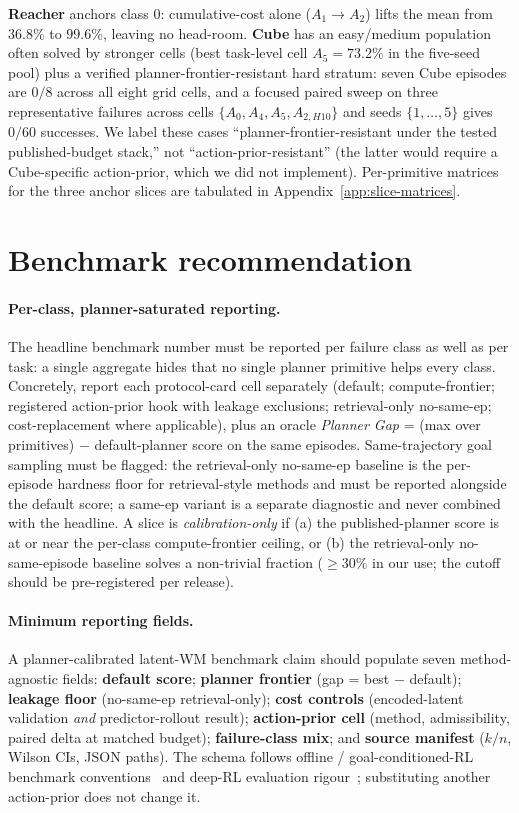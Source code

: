 \documentclass{article}
\begin{document}
\textbf{Reacher} anchors class 0: cumulative-cost alone ($A_1 \to A_2$) lifts the mean from $36.8\%$ to $99.6\%$, leaving no head-room. \textbf{Cube} has an easy/medium population often solved by stronger cells (best task-level cell $A_5 = 73.2\%$ in the five-seed pool) plus a verified planner-frontier-resistant hard stratum: seven Cube episodes are $0/8$ across all eight grid cells, and a focused paired sweep on three representative failures across cells $\{A_0, A_4, A_5, A_{2,H10}\}$ and seeds $\{1,\dots,5\}$ gives $0/60$ successes. We label these cases ``planner-frontier-resistant under the tested published-budget stack,'' not ``action-prior-resistant'' (the latter would require a Cube-specific action-prior, which we did not implement). Per-primitive matrices for the three anchor slices are tabulated in Appendix~\ref{app:slice-matrices}.

\section{Benchmark recommendation}
\label{sec:recommendation}

\paragraph{Per-class, planner-saturated reporting.}
The headline benchmark number must be reported per failure class as well as per task: a single aggregate hides that no single planner primitive helps every class. Concretely, report each protocol-card cell separately (default; compute-frontier; registered action-prior hook with leakage exclusions; retrieval-only no-same-ep; cost-replacement where applicable), plus an oracle \emph{Planner Gap} = (max over primitives) $-$ default-planner score on the same episodes. Same-trajectory goal sampling must be flagged: the retrieval-only no-same-ep baseline is the per-episode hardness floor for retrieval-style methods and must be reported alongside the default score; a same-ep variant is a separate diagnostic and never combined with the headline. A slice is \emph{calibration-only} if (a) the published-planner score is at or near the per-class compute-frontier ceiling, or (b) the retrieval-only no-same-episode baseline solves a non-trivial fraction ($\geq 30\%$ in our use; the cutoff should be pre-registered per release).

\paragraph{Minimum reporting fields.}
A planner-calibrated latent-WM benchmark claim should populate seven method-agnostic fields: \textbf{default score}; \textbf{planner frontier} (gap = best $-$ default); \textbf{leakage floor} (no-same-ep retrieval-only); \textbf{cost controls} (encoded-latent validation \emph{and} predictor-rollout result); \textbf{action-prior cell} (method, admissibility, paired delta at matched budget); \textbf{failure-class mix}; and \textbf{source manifest} ($k/n$, Wilson CIs, JSON paths). The schema follows offline / goal-conditioned-RL benchmark conventions~\cite{fu2020d4rl,park2025ogbench} and deep-RL evaluation rigour~\cite{henderson2018drltm,agarwal2021precipice}; substituting another action-prior does not change it.
\end{document}
